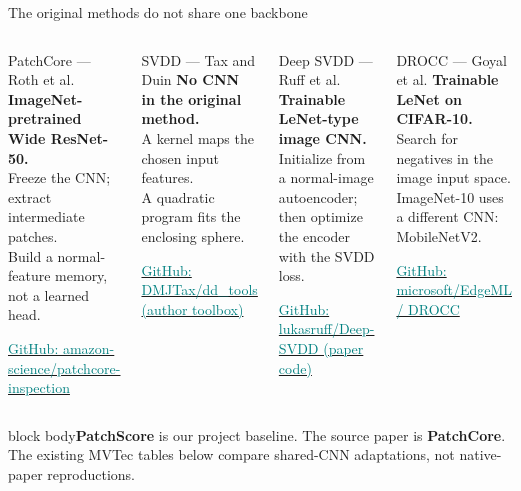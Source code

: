 \documentclass[aspectratio=169,professionalfonts,10pt]{beamer}
\def\phase{NBD}
\newcommand{\band}[1]{\begin{beamercolorbox}[rounded=true,sep=0.17cm]{block body}#1\end{beamercolorbox}}
\begin{document}
\def\phase{PAPER SOURCES}
\begin{frame}[t]{The original methods do not share one backbone}
\small
\vspace{.08cm}
\begin{columns}[T,onlytextwidth]
\begin{block}{PatchCore --- Roth et al.}
\textbf{ImageNet-pretrained Wide ResNet-50.}\\[.06cm]
Freeze the CNN; extract intermediate patches.\\
Build a normal-feature memory, not a learned head.
\par\vspace{.10cm}
\href{https://github.com/amazon-science/patchcore-inspection/tree/fcaa92f124fb1ad74a7acf56726decd4b27cbcad}{\textcolor{teal}{GitHub: amazon-science/patchcore-inspection}}
\end{block}
\begin{block}{SVDD --- Tax and Duin}
\textbf{No CNN in the original method.}\\[.06cm]
A kernel maps the chosen input features.\\
A quadratic program fits the enclosing sphere.
\par\vspace{.10cm}
\href{https://github.com/DMJTax/dd_tools/tree/efaaf04efae1f8be78906836a5d31547b48be7af}{\textcolor{teal}{GitHub: DMJTax/dd\_tools (author toolbox)}}
\end{block}
\begin{block}{Deep SVDD --- Ruff et al.}
\textbf{Trainable LeNet-type image CNN.}\\[.06cm]
Initialize from a normal-image autoencoder;\\
then optimize the encoder with the SVDD loss.
\par\vspace{.10cm}
\href{https://github.com/lukasruff/Deep-SVDD/tree/e20f18c8d0ad9dc01cad09fdf311bd861351a9ad}{\textcolor{teal}{GitHub: lukasruff/Deep-SVDD (paper code)}}
\end{block}
\begin{block}{DROCC --- Goyal et al.}
\textbf{Trainable LeNet on CIFAR-10.}\\[.06cm]
Search for negatives in the image input space.\\
ImageNet-10 uses a different CNN: MobileNetV2.
\par\vspace{.10cm}
\href{https://github.com/microsoft/EdgeML/tree/81025fce8ba28707eabe72e11bf3987a8d745608/examples/pytorch/DROCC}{\textcolor{teal}{GitHub: microsoft/EdgeML / DROCC}}
\end{block}
\end{columns}
\vspace{.08cm}
\band{\footnotesize \textbf{PatchScore} is our project baseline. The source paper is \textbf{PatchCore}.\\[.04cm]
The existing MVTec tables below compare shared-CNN adaptations, not native-paper reproductions.}
\end{frame}
\end{document}
